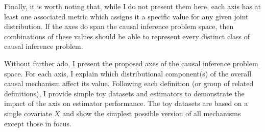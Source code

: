 \documentclass[../main.tex]{subfiles}
\begin{document}
\vspace{\baselineskip}
Finally, it is worth noting that, while I do not present them here, each axis has at least one associated metric which assigns it a specific value for any given joint distribution. If the axes do span the causal inference problem space, then combinations of these values should be able to represent every distinct class of causal inference problem.\par


\vspace{\baselineskip}
Without further ado, I present the proposed axes of the causal inference problem space. For each axis, I explain which distributional component(s) of the overall causal mechanism affect its value. Following each definition (or group of related definitions), I provide simple toy datasets and estimators to demonstrate the impact of the axis on estimator performance. The toy datasets are based on a single covariate  \( X \) and show the simplest possible version of all mechanisms except those in focus.\par
\end{document}
